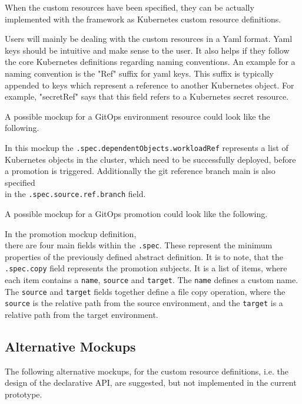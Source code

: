When the custom resources have been specified,
they can be actually implemented with the framework
as Kubernetes custom resource definitions.

Users will mainly be dealing with the custom resources in a Yaml format.
Yaml keys should be intuitive and make sense to the user.
It also helps if they follow the core Kubernetes definitions regarding naming conventions.
An example for a naming convention is the "Ref" suffix for yaml keys.
This suffix is typically appended to keys which represent a reference to another Kubernetes
object.
For example, "secretRef" says that this field refers to a Kubernetes secret resource.

A possible mockup for a GitOps environment resource
could look like the following.



In this mockup the \lstinline|.spec.dependentObjects.workloadRef|
represents a list of Kubernetes objects in the cluster,
which need to be successfully deployed,
before a promotion is triggered.
Additionally the git reference branch main is also specified \\
in the \lstinline|.spec.source.ref.branch| field.

A possible mockup for a GitOps promotion 
could look like the following.



In the promotion mockup definition,\\
there are four main fields within the \lstinline|.spec|.
These represent the minimum properties of the previously defined abstract definition.
It is to note, that
the \lstinline|.spec.copy| field represents the promotion subjects.
It is a list of items, where each item contains
a \lstinline|name|, \lstinline|source| and \lstinline|target|.
The \lstinline|name| defines a custom name.
The \lstinline|source| and \lstinline|target| fields together define a
file copy operation,
where the \lstinline|source| is the relative path from the source environment,
and the \lstinline|target| is a relative path from the target environment.

\subsection{Alternative Mockups}

The following alternative mockups,
for the custom resource definitions,
i.e. the design of the declarative API,
are suggested, but not implemented in the current prototype.

